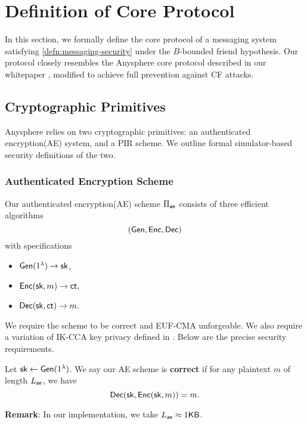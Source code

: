 \section{Definition of Core Protocol}
\label{sec:asphr-defn}
In this section, we formally define the core protocol of a messaging system satisfying \cref{defn:messaging-security} under the $B$-bounded friend hypothesis. Our protocol closely resembles the Anysphere core protocol described in our whitepaper \cite{whitepaper}, modified to achieve full prevention against CF attacks.
\subsection{Cryptographic Primitives}
Anysphere relies on two cryptographic primitives: an authenticated encryption(AE) system, and a PIR scheme. We outline formal simulator-based security definitions of the two. 

\subsubsection{Authenticated Encryption Scheme}
\label{subsec:AE}
Our authenticated encryption(AE) scheme $\Pi_{\mathsf{ae}}$ consists of three efficient algorithms 
$$(\mathsf{Gen}, \mathsf{Enc}, \mathsf{Dec})$$
with specifications
\begin{itemize}
    \item $\mathsf{Gen}(1^{\lambda}) \to {\ensuremath{\mathsf{sk}}}$,
    \item $\mathsf{Enc}({\mathsf{sk}}, m) \to \mathsf{ct},$
    \item $\mathsf{Dec}({\mathsf{sk}}, \mathsf{ct}) \to m.$
\end{itemize}
We require the scheme to be correct and EUF-CMA unforgeable. We also require a variation of IK-CCA key privacy defined in \cite{BBDP01keyprivate}. Below are the precise security requirements.

\begin{definition}
\label{defn:AE-correctness}
Let ${\mathsf{sk}} \leftarrow \mathsf{Gen}(1^{\lambda})$. We say our AE scheme is \textbf{correct} if for any plaintext $m$ of length $L_{\mathsf{ae}}$, we have
$$\mathsf{Dec}({\mathsf{sk}}, \mathsf{Enc}({\mathsf{sk}}, m)) = m.$$
\end{definition}
\textbf{Remark}: In our implementation, we take $L_{\mathsf{ae}} \approx 1 \mathsf{KB}$.

